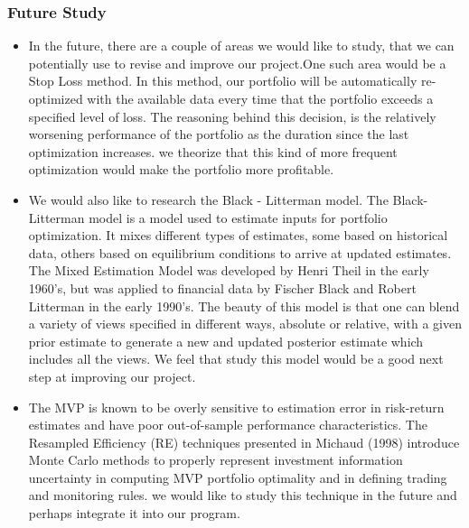 \documentclass[12pt,titlepage,letter]{article}
\begin{document}
		\subsubsection{Future Study}
			\begin{itemize}
				\item In the future, there are a couple of areas we would like to study, that we can potentially use to revise and improve our project.One such area would be a Stop Loss method. In this method, our portfolio will be automatically re-optimized with the available data every time that the portfolio exceeds a specified level of loss. The reasoning behind this decision, is the relatively worsening performance of the portfolio as the duration since the last optimization increases. we theorize that this kind of more frequent optimization would make the portfolio more profitable.

				\item We would also like to research the Black - Litterman model. The Black-Litterman model is a model used to estimate inputs for portfolio optimization. It mixes different types of estimates, some based on historical data, others based on equilibrium conditions to arrive at updated estimates. The Mixed Estimation Model was developed by Henri Theil in the early 1960's, but was applied to financial data by Fischer Black and Robert Litterman in the early 1990's. The beauty of this model is that one can blend a variety of views specified in different ways, absolute or relative, with a given prior estimate to generate a new and updated posterior estimate which includes all the views.  We feel that study this model would be a good next step at improving our project.

				\item The MVP is known to be overly sensitive to estimation error in risk-return estimates and have poor out-of-sample performance characteristics. The Resampled Efficiency (RE) techniques presented in Michaud (1998) introduce Monte Carlo methods to properly represent investment information uncertainty in computing MVP portfolio optimality and in defining trading and monitoring rules.  we would like to study this technique in the future and perhaps integrate it into our program.
			\end{itemize}
\end{document}
